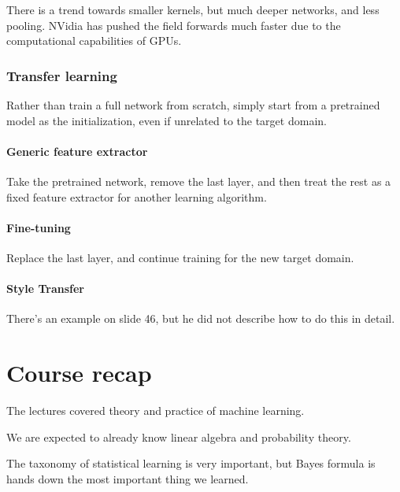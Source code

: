 \documentclass{idc_msc}
\begin{document}
There is a trend towards smaller kernels, but much deeper networks, and less pooling.
NVidia has pushed the field forwards much faster due to the computational capabilities of GPUs.

\subsubsection{Transfer learning}

Rather than train a full network from scratch, simply start from a pretrained model as the initialization, even if unrelated to the target domain.

\paragraph{Generic feature extractor}

Take the pretrained network, remove the last layer, and then treat the rest as a fixed feature extractor for another learning algorithm.

\paragraph{Fine-tuning}

Replace the last layer, and continue training for the new target domain.

\paragraph{Style Transfer}

There's an example on slide 46, but he did not describe how to do this in detail.


\clearpage
\section{Course recap}

The lectures covered theory and practice of machine learning.

We are expected to already know linear algebra and probability theory.

The taxonomy of statistical learning is very important, but Bayes formula is hands down the most important thing we learned.
\end{document}
